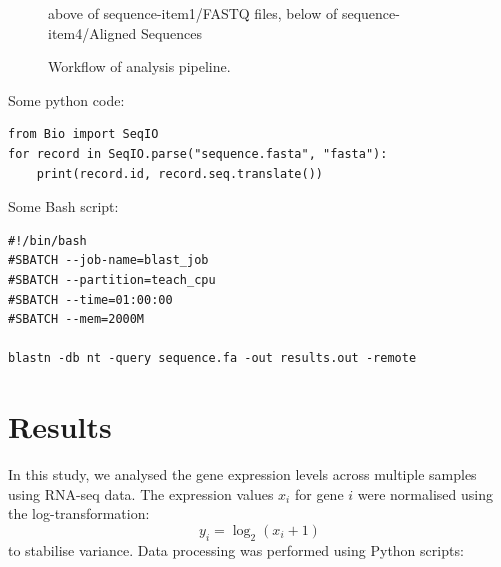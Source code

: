 \documentclass[12pt]{article}
\begin{document}
\begin{figure}[htbp]
\begin{center}
\vspace{3em}
{above of sequence-item1/FASTQ files, below of sequence-item4/Aligned Sequences}
\vspace{4em}
\caption{Workflow of analysis pipeline.}
    \label{fig:workflow}
\end{center}
\end{figure}




Some python code: 
\begin{verbatim}
from Bio import SeqIO
for record in SeqIO.parse("sequence.fasta", "fasta"):
    print(record.id, record.seq.translate())
\end{verbatim} 

Some Bash script:
\begin{verbatim}
#!/bin/bash
#SBATCH --job-name=blast_job
#SBATCH --partition=teach_cpu
#SBATCH --time=01:00:00
#SBATCH --mem=2000M

blastn -db nt -query sequence.fa -out results.out -remote
\end{verbatim}



\section*{Results}
In this study, we analysed the gene expression levels across multiple samples using RNA-seq data. The expression values $x_i$ for gene $i$ were normalised using the log-transformation:
\[
y_i = \log_2(x_i + 1)
\]
to stabilise variance. Data processing was performed using Python scripts:
\end{document}
